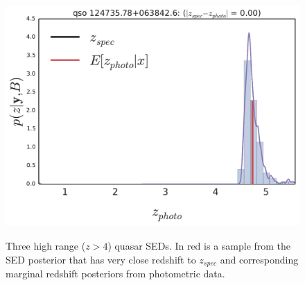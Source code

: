\documentclass{article}
\begin{document}
\begin{figure}[t]
{\includegraphics[width=.56\columnwidth]{../../figs/quasar_plots/close_hi/quasar_1854_posterior_z}
}
\vskip -0.2in
\caption{ Three high range ($z > 4$) quasar SEDs.  In red is a sample from the SED posterior that has very close redshift to $z_{spec}$ and corresponding marginal redshift posteriors from photometric data. }
\label{fig:hi}
\vskip -0.2in
\end{figure}
\clearpage
\end{document}
